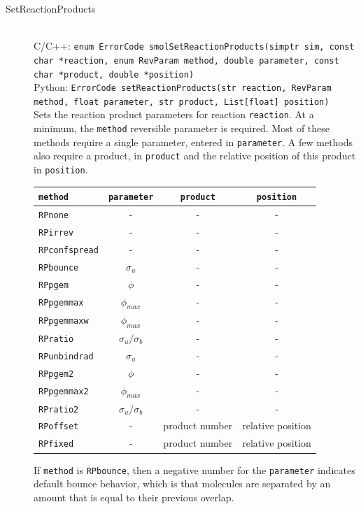 \documentclass {book}
\newcommand {\ttt} {\texttt}
\begin{document}
\begin{description}
\item[SetReactionProducts]
\hfill \\
C/C++: \ttt{enum ErrorCode smolSetReactionProducts(simptr sim, const char *reaction, enum RevParam method, double parameter, const char *product, double *position)}\\
Python: \ttt{ErrorCode setReactionProducts(str reaction, RevParam method, float parameter, str product, List[float] position)}\\
Sets the reaction product parameters for reaction \ttt{reaction}. At a minimum, the \ttt{method} reversible parameter is required. Most of these methods require a single parameter, entered in \ttt{parameter}. A few methods also require a product, in \ttt{product} and the relative position of this product in \ttt{position}.

\begin{longtable}[c]{lccc}
\ttt{method} & \ttt{parameter} & \ttt{product} & \ttt{position}\\
\hline
\ttt{RPnone} & - & - & -\\
\ttt{RPirrev} & - & - & -\\
\ttt{RPconfspread} & - & - & -\\
\ttt{RPbounce} & $\sigma_u$ & - & -\\
\ttt{RPpgem} & $\phi$ & - & -\\
\ttt{RPpgemmax} & $\phi_{max}$ & - & -\\
\ttt{RPpgemmaxw} & $\phi_{max}$ & - & -\\
\ttt{RPratio} & $\sigma_u/\sigma_b$ & - & -\\
\ttt{RPunbindrad} & $\sigma_u$ & - & -\\
\ttt{RPpgem2} & $\phi$ & - & -\\
\ttt{RPpgemmax2} & $\phi_{max}$ & - & -\\
\ttt{RPratio2} & $\sigma_u/\sigma_b$ & - & -\\
\ttt{RPoffset} & - & product number & relative position\\
\ttt{RPfixed} & - & product number & relative position\\
\end{longtable}

If \ttt{method} is \ttt{RPbounce}, then a negative number for the \ttt{parameter} indicates default bounce behavior, which is that molecules are separated by an amount that is equal to their previous overlap.

\end{description}
\end{document}
